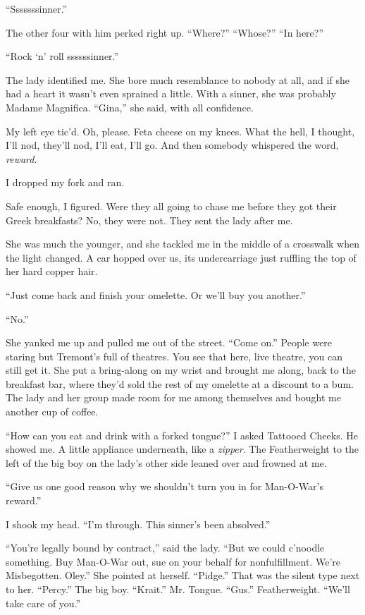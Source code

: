 ``Sssssssinner.''

The other four with him perked right up. ``Where?'' ``Whose?'' ``In here?''

``Rock `n' roll ssssssinner.''

The lady identified me. She bore much resemblance to nobody at all, and if she had a heart it wasn't even sprained a little. With a sinner, she was probably Madame Magnifica. ``Gina,'' she said, with all confidence.

My left eye tic'd. Oh, please. Feta cheese on my knees. What the hell, I thought, I'll nod, they'll nod, I'll eat, I'll go. And then somebody whispered the word, \textit{reward}.

I dropped my fork and ran.

Safe enough, I figured. Were they all going to chase me before they got their Greek breakfasts? No, they were not. They sent the lady after me.

She was much the younger, and she tackled me in the middle of a crosswalk when the light changed. A car hopped over us, its undercarriage just ruffling the top of her hard copper hair.

``Just come back and finish your omelette. Or we'll buy you another.''

``No.''

She yanked me up and pulled me out of the street. ``Come on.'' People were staring but Tremont's full of theatres. You see that here, live theatre, you can still get it. She put a bring-along on my wrist and brought me along, back to the breakfast bar, where they'd sold the rest of my omelette at a discount to a bum. The lady and her group made room for me among themselves and bought me another cup of coffee.

``How can you eat and drink with a forked tongue?'' I asked Tattooed Cheeks. He showed me. A little appliance underneath, like a \textit{zipper}. The Featherweight to the left of the big boy on the lady's other side leaned over and frowned at me.

``Give us one good reason why we shouldn't turn you in for Man-O-War's reward.''

I shook my head. ``I'm through. This sinner's been absolved.''

``You're legally bound by contract,'' said the lady. ``But we could c'noodle something. Buy Man-O-War out, sue on your behalf for nonfulfillment. We're Misbegotten. Oley.'' She pointed at herself. ``Pidge.'' That was the silent type next to her. ``Percy.'' The big boy. ``Krait.'' Mr. Tongue. ``Gus.'' Featherweight. ``We'll take care of you.''

